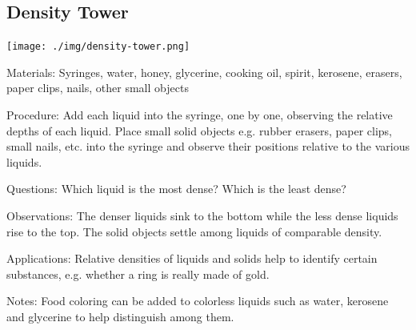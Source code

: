 \begin{multicols}{2}

\subsection{Density Tower}
\label{sub:density-column}

\begin{center}
\texttt{[image: ./img/density-tower.png]}
\end{center}

\begin{description*}
\item[Materials:]{Syringes, water, honey, glycerine, cooking oil, spirit, kerosene, erasers, paper clips, nails, other small objects}
\item[Procedure:]{Add each liquid into the syringe, one by one, observing the relative depths of each liquid. Place small solid objects e.g. rubber erasers, paper clips, small nails, etc. into the syringe and observe their positions relative to the various liquids.}
\item[Questions:]{Which liquid is the most dense? Which is the least dense?}
\item[Observations:]{The denser liquids sink to the bottom while the less dense liquids rise to the top. The solid objects settle among liquids of comparable density.}
\item[Applications:]{Relative densities of liquids and solids help to identify certain substances, e.g. whether a ring is really made of gold.}
\item[Notes:]{Food coloring can be added to colorless liquids such as water, kerosene and glycerine to help distinguish among them.}
\end{description*}



\end{multicols}
